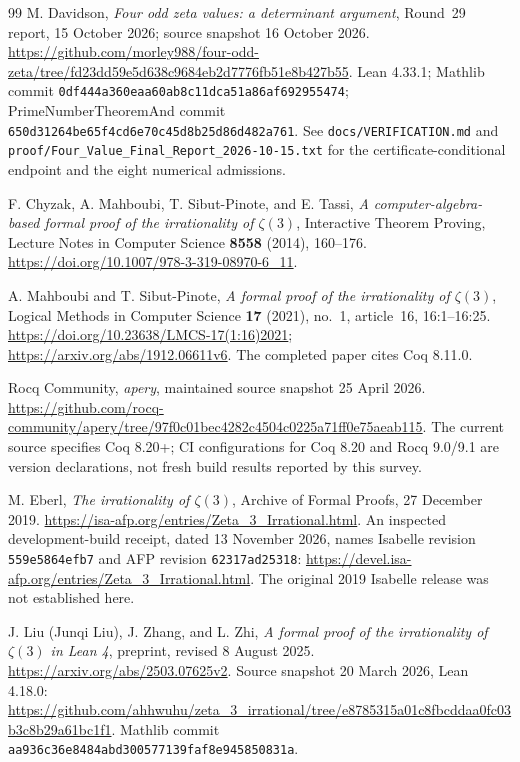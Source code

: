\documentclass[11pt,letterpaper]{article}
\theoremstyle{definition}
\begin{document}
\begin{thebibliography}{99}
M. Davidson, \emph{Four odd zeta values: a determinant argument},
Round~29 report, 15 October 2026; source snapshot 16 October 2026.
\url{https://github.com/morley988/four-odd-zeta/tree/fd23dd59e5d638c9684eb2d7776fb51e8b427b55}.
Lean 4.33.1; Mathlib commit
\texttt{0df444a360eaa60ab8c11dca51a86af692955474};
PrimeNumberTheoremAnd commit
\texttt{650d31264be65f4cd6e70c45d8b25d86d482a761}.
See \texttt{docs/VERIFICATION.md} and
\texttt{proof/Four\_Value\_Final\_Report\_2026-10-15.txt} for the
certificate-conditional endpoint and the eight numerical admissions.

F. Chyzak, A. Mahboubi, T. Sibut-Pinote, and E. Tassi,
\emph{A computer-algebra-based formal proof of the irrationality of
$\zeta(3)$}, Interactive Theorem Proving, Lecture Notes in Computer
Science \textbf{8558} (2014), 160--176.
\url{https://doi.org/10.1007/978-3-319-08970-6_11}.

A. Mahboubi and T. Sibut-Pinote, \emph{A formal proof of the
irrationality of $\zeta(3)$}, Logical Methods in Computer Science
\textbf{17} (2021), no.~1, article~16, 16:1--16:25.
\url{https://doi.org/10.23638/LMCS-17(1:16)2021};
\url{https://arxiv.org/abs/1912.06611v6}.
The completed paper cites Coq 8.11.0.

Rocq Community, \emph{apery}, maintained source snapshot
25 April 2026.
\url{https://github.com/rocq-community/apery/tree/97f0c01bec4282c4504c0225a71ff0e75aeab115}.
The current source specifies Coq 8.20+; CI configurations for Coq 8.20
and Rocq 9.0/9.1 are version declarations, not fresh build results
reported by this survey.

M. Eberl, \emph{The irrationality of $\zeta(3)$}, Archive of Formal
Proofs, 27 December 2019.
\url{https://isa-afp.org/entries/Zeta_3_Irrational.html}.
An inspected development-build receipt, dated 13 November 2026, names
Isabelle revision \texttt{559e5864efb7} and AFP revision
\texttt{62317ad25318}:
\url{https://devel.isa-afp.org/entries/Zeta_3_Irrational.html}.
The original 2019 Isabelle release was not established here.

J. Liu (Junqi Liu), J. Zhang, and L. Zhi, \emph{A formal proof of the
irrationality of $\zeta(3)$ in Lean 4}, preprint, revised 8 August 2025.
\url{https://arxiv.org/abs/2503.07625v2}.
Source snapshot 20 March 2026, Lean 4.18.0:
\url{https://github.com/ahhwuhu/zeta_3_irrational/tree/e8785315a01c8fbcddaa0fc03b3c8b29a61bc1f1}.
Mathlib commit \texttt{aa936c36e8484abd300577139faf8e945850831a}.


\end{thebibliography}
\end{document}

